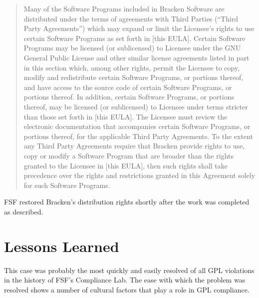 \documentclass[12pt]{report}
\begin{document}
\begin{quotation}
Many of the Software Programs included in Bracken Software are distributed
under the terms of agreements with Third Parties (``Third Party
Agreements'') which may expand or limit the Licensee's rights to use
certain Software Programs as set forth in [this EULA].  Certain Software
Programs may be licensed (or sublicensed) to Licensee under the GNU
General Public License and other similar license agreements listed in part
in this section which, among other rights, permit the Licensee to copy,
modify and redistribute certain Software Programs, or portions thereof,
and have access to the source code of certain Software Programs, or
portions thereof.  In addition, certain Software Programs, or portions
thereof, may be licensed (or sublicensed) to Licensee under terms stricter
than those set forth in [this EULA].  The Licensee must review the
electronic documentation that accompanies certain Software Programs, or
portions thereof, for the applicable Third Party Agreements.  To the
extent any Third Party Agreements require that Bracken provide rights to
use, copy or modify a Software Program that are broader than the rights
granted to the Licensee in [this EULA], then such rights shall take
precedence over the rights and restrictions granted in this Agreement
solely for such Software Programs.
\end{quotation}

FSF restored Bracken's distribution rights shortly after the work was
completed as described.

\section{Lessons Learned}

This case was probably the most quickly and easily resolved of all GPL
violations in the history of FSF's Compliance Lab.  The ease with which
the problem was resolved shows a number of cultural factors that play a
role in GPL compliance.
\end{document}
